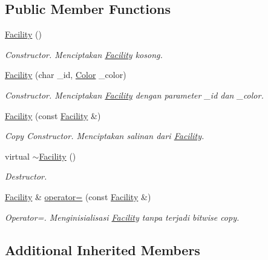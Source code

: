 \subsection*{Public Member Functions}
\begin{DoxyCompactItemize}
\item 
\hyperlink{classFacility_aea57fdf380a334f24c6861cf272b4a98}{Facility} ()
\begin{DoxyCompactList}\small\item\em Constructor. Menciptakan \hyperlink{classFacility}{Facility} kosong. \end{DoxyCompactList}\item 
\hyperlink{classFacility_a9911098ad4cc8835ec02b4c654e84c80}{Facility} (char \+\_\+id, \hyperlink{color_8h_ab87bacfdad76e61b9412d7124be44c1c}{Color} \+\_\+color)
\begin{DoxyCompactList}\small\item\em Constructor. Menciptakan \hyperlink{classFacility}{Facility} dengan parameter \+\_\+id dan \+\_\+color. \end{DoxyCompactList}\item 
\hyperlink{classFacility_aac058a14cc73b7f3fe768811a98ef045}{Facility} (const \hyperlink{classFacility}{Facility} \&)
\begin{DoxyCompactList}\small\item\em Copy Constructor. Menciptakan salinan dari \hyperlink{classFacility}{Facility}. \end{DoxyCompactList}\item 
virtual \hyperlink{classFacility_a0d756a7273f5cb2fc57575459ba45670}{$\sim$\+Facility} ()
\begin{DoxyCompactList}\small\item\em Destructor. \end{DoxyCompactList}\item 
\hyperlink{classFacility}{Facility} \& \hyperlink{classFacility_a4f7e56d32d00129e4373e6031a983530}{operator=} (const \hyperlink{classFacility}{Facility} \&)
\begin{DoxyCompactList}\small\item\em Operator=. Menginisialisasi \hyperlink{classFacility}{Facility} tanpa terjadi bitwise copy. \end{DoxyCompactList}\end{DoxyCompactItemize}
\subsection*{Additional Inherited Members}


